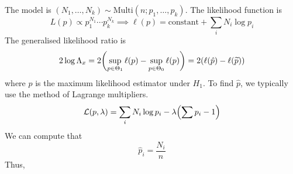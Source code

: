 The model is \( (N_1, \dots, N_k) \sim \mathrm{Multi}(n; p_1, \dots, p_k) \).
The likelihood function is
\[ L(p) \propto p_1^{N_1} \cdots p_k^{N_k} \implies \ell(p) = \text{constant} + \sum_i N_i \log p_i \]
The generalised likelihood ratio is
\[ 2 \log \Lambda_x = 2\qty(\sup_{p \in \Theta_1} \ell(p) - \sup_{p \in \Theta_0} \ell(p)) = 2\qty(\ell(\hat p) - \ell(\widetilde p)) \]
where \( \hat p \) is the maximum likelihood estimator under \( H_1 \).
To find \( \hat p \), we typically use the method of Lagrange multipliers.
\[ \mathcal L(p, \lambda) = \sum_i N_i \log p_i - \lambda \qty(\sum p_i - 1) \]
We can compute that
\[ \hat p_i = \frac{N_i}{n} \]
Thus,
